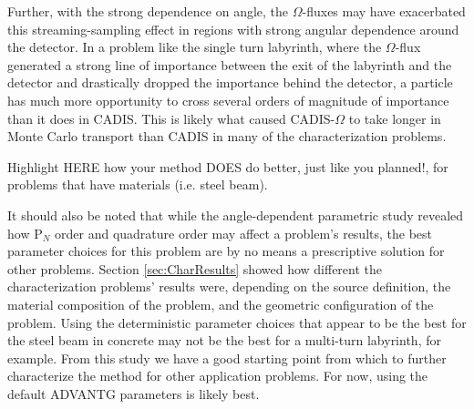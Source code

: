 Further, with the strong dependence on angle, the $\Omega$-fluxes may
have exacerbated this streaming-sampling effect in regions with strong angular
dependence around the detector. In a problem like the single turn labyrinth,
where the $\Omega$-flux generated a strong line of importance between the exit
of the labyrinth and the detector and drastically dropped the importance behind
the detector, a particle has much more opportunity to cross several orders of
magnitude of importance than it does in CADIS. This is likely what caused
CADIS-$\Omega$ to take longer in Monte Carlo transport than CADIS in many of the
characterization problems.

Highlight HERE how your method DOES do better, just like you planned!, for problems 
that have materials (i.e. steel beam). 

It should also be noted that while the angle-dependent parametric study revealed
how P$_N$ order and quadrature order may affect a problem's results, the
best parameter choices for this problem are by no means a prescriptive solution
for other problems. Section \ref{sec:CharResults}
showed how different the characterization problems' results were, depending on
the source definition, the material composition of the problem, and the
geometric configuration of the problem. Using the deterministic parameter
choices that appear to be the best for the steel beam in concrete may not be the best
for a multi-turn labyrinth, for example. From this study we have a good starting point
from which to further characterize the method for other application problems.
For now, using the default ADVANTG parameters is likely best.

